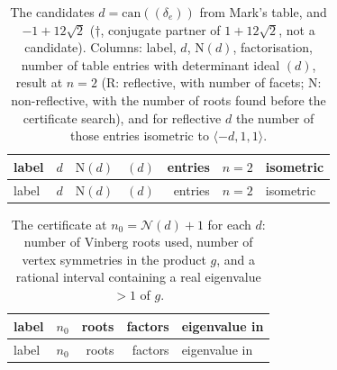 \documentclass[11pt]{amsart}
\theoremstyle{definition}
\newcommand{\N}{\mathrm{N}}
\newcommand{\Nmax}{\mathcal{N}}
\begin{document}
{\footnotesize
\begin{longtable}{llrlrll}
\caption{The \NCand{} candidates $d=\mathrm{can}((\delta_e))$ from Mark's table, and
$-1+12\sqrt2$ ($\dagger$, conjugate partner of $1+12\sqrt2$, not a candidate). Columns: label,
$d$, $\N(d)$, factorisation, number of table entries with determinant ideal $(d)$, result at
$n=2$ (R: reflective, with number of facets; N: non-reflective, with the number of roots found
before the certificate search), and for reflective $d$ the number of those entries isometric to
$\langle-d,1,1\rangle$.}\label{tab:candidates}\\
\toprule
label & $d$ & $\N(d)$ & $(d)$ & entries & $n=2$ & isometric\\
\midrule\endfirsthead
\toprule
label & $d$ & $\N(d)$ & $(d)$ & entries & $n=2$ & isometric\\
\midrule\endhead

\end{longtable}}

{\footnotesize
\begin{longtable}{lrrrl}
\caption{The certificate at $n_0=\Nmax(d)+1$ for each $d$: number of Vinberg roots used,
number of vertex symmetries in the product $g$, and a rational interval containing a real
eigenvalue $>1$ of $g$.}\label{tab:certs}\\
\toprule
label & $n_0$ & roots & factors & eigenvalue in\\
\midrule\endfirsthead
\toprule
label & $n_0$ & roots & factors & eigenvalue in\\
\midrule\endhead

\end{longtable}}
\end{document}
